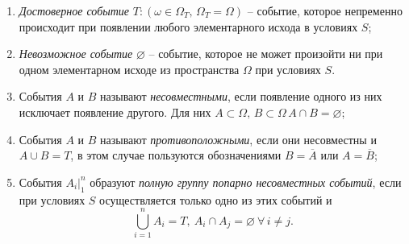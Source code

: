 \documentclass[polytech/stats/exam-2023/stats-exam-2023.tex]{subfiles}
\begin{document}
    \begin{enumerate}
        \item \textit{Достоверное событие} $T: \left(\omega \in \Omega_T, \, \Omega_T = \Omega\right)$ -- событие, которое непременно
        происходит при появлении любого элементарного исхода в условиях $S$;
        \item \textit{Невозможное событие} $\varnothing$ -- событие, которое не может произойти ни при одном элементарном исходе
        из пространства $\Omega$ при условиях $S$.
        \item События $A$ и $B$ называют \textit{несовместными}, если появление одного из них исключает появление другого. Для них
        $A \subset \Omega, \, B \subset \Omega\, A \cap B = \varnothing$;
        \item События $A$ и $B$ называют \textit{противоположными}, если они несовместны и $A \cup B = T$, в этом случае пользуются
        обозначениями $B = \overline{A}$ или $A = \overline{B}$;
        \item События $\displaystyle A_i \vert_1^n$ образуют \textit{полную группу попарно несовместных событий}, если при условиях $S$
        осуществляется только одно из этих событий и 
        \begin{equation*}
            \bigcup_{i = 1}^n A_i = T, \ A_i \cap A_j = \varnothing \ \forall \, i \neq j.
        \end{equation*}
    \end{enumerate}
\end{document}
